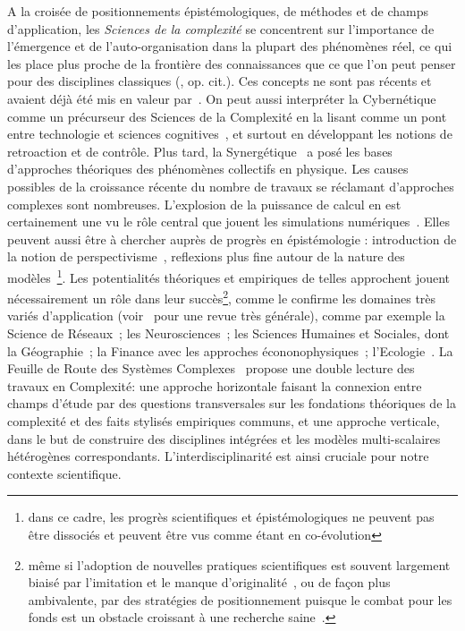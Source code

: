 {}{
A la croisée de positionnements épistémologiques, de méthodes et de champs d'application, les \emph{Sciences de la complexité} se concentrent sur l'importance de l'émergence et de l'auto-organisation dans la plupart des phénomènes réel, ce qui les place plus proche de la frontière des connaissances que ce que l'on peut penser pour des disciplines classiques (, op. cit.). Ces concepts ne sont pas récents et avaient déjà été mis en valeur par~\cite{anderson1972more}. On peut aussi interpréter la Cybernétique comme un précurseur des Sciences de la Complexité en la lisant comme un pont entre technologie et sciences cognitives~\cite{wiener1948cybernetics}, et surtout en développant les notions de retroaction et de contrôle. Plus tard, la Synergétique~\cite{haken1980synergetics} a posé les bases d'approches théoriques des phénomènes collectifs en physique. Les causes possibles de la croissance récente du nombre de travaux se réclamant d'approches complexes sont nombreuses. L'explosion de la puissance de calcul en est certainement une vu le rôle central que jouent les simulations numériques~\cite{varenne2010simulations}. Elles peuvent aussi être à chercher auprès de progrès en épistémologie : introduction de la notion de perspectivisme~\cite{giere2010scientific}, reflexions plus fine autour de la nature des modèles~\cite{varenne2013modeliser}\footnote{dans ce cadre, les progrès scientifiques et épistémologiques ne peuvent pas être dissociés et peuvent être vus comme étant en co-évolution}. Les potentialités théoriques et empiriques de telles approchent jouent nécessairement un rôle dans leur succès\footnote{même si l'adoption de nouvelles pratiques scientifiques est souvent largement biaisé par l'imitation et le manque d'originalité~\cite{dirk1999measure}, ou de façon plus ambivalente, par des stratégies de positionnement puisque le combat pour les fonds est un obstacle croissant à une recherche saine~\cite{bollen2014funding}.}, comme le confirme les domaines très variés d'application (voir~\cite{newman2011complex} pour une revue très générale), comme par exemple la Science de Réseaux~\cite{barabasi2002linked}; les Neurosciences~\cite{koch1999complexity}; les Sciences Humaines et Sociales,  dont la Géographie~\cite{manson2001simplifying}\cite{pumain1997pour}; la Finance avec les approches écononophysiques~\cite{stanley1999econophysics}; l'Ecologie~\cite{grimm2005pattern}. La Feuille de Route des Systèmes Complexes~\cite{2009arXiv0907.2221B} propose une double lecture des travaux en Complexité: une approche horizontale faisant la connexion entre champs d'étude par des questions transversales sur les fondations théoriques de la complexité et des faits stylisés empiriques communs, et une approche verticale, dans le but de construire des disciplines intégrées et les modèles multi-scalaires hétérogènes correspondants. L'interdisciplinarité est ainsi cruciale pour notre contexte scientifique.
}

